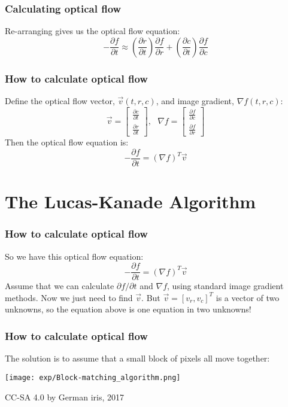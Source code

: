 \documentclass{beamer}
\begin{document}
\begin{frame}
  \frametitle{Calculating optical flow}

  Re-arranging gives us the optical flow equation:
  \[
  -\frac{\partial f}{\partial t} \approx 
  \left(\frac{\partial r}{\partial t}\right)\frac{\partial f}{\partial r}+
  \left(\frac{\partial c}{\partial t}\right)\frac{\partial f}{\partial c}
  \]
\end{frame}

\begin{frame}
  \frametitle{How to calculate optical flow}
  
  Define the optical flow vector, $\vec{v}(t,r,c)$, and image gradient, $\nabla f(t,r,c)$:
  \[
  \vec{v}=\left[\begin{array}{c}\frac{\partial c}{\partial t}\\\frac{\partial r}{\partial t}\end{array}\right],~~~
  \nabla f=\left[\begin{array}{c}\frac{\partial f}{\partial c}\\\frac{\partial f}{\partial r}\end{array}\right]
  \]
  Then the optical flow equation is:
  \[
  -\frac{\partial f}{\partial t} =(\nabla f)^T\vec{v}
  \]
\end{frame}

\section[Lucas-Kanade]{The Lucas-Kanade Algorithm}
\setcounter{subsection}{1}

\begin{frame}
  \frametitle{How to calculate optical flow}

  So we have this optical flow equation:
  \[
  -\frac{\partial f}{\partial t} =(\nabla f)^T\vec{v}
  \]
  Assume that we can calculate $\partial f/\partial t$ and $\nabla f$,
  using standard image gradient methods.  Now we just need to find
  $\vec{v}$.  But $\vec{v}=[v_r, v_c]^T$ is a vector of two unknowns,
  so the equation above is one equation in two unknowns!
\end{frame}

\begin{frame}
  \frametitle{How to calculate optical flow}

  The solution is to assume that a small block of pixels all move together:
  
  {\centering
    \texttt{[image: exp/Block-matching\_algorithm.png]}

    {\tiny CC-SA 4.0 by German iris, 2017}
  }
\end{frame}
\end{document}

